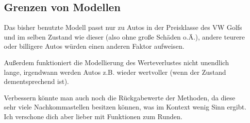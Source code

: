 \documentclass{scrartcl}   %
\begin{document}
\subsection{Grenzen von Modellen}

Das bisher benutzte Modell passt nur zu Autos in der Preisklasse des VW Golfs und im selben Zustand wie dieser (also ohne große Schäden o.Ä.), andere teurere oder billigere Autos würden einen anderen Faktor aufweisen.

Außerdem funktioniert die Modellierung des Werteverlustes nicht unendlich lange, irgendwann werden Autos z.B. wieder wertvoller (wenn der Zustand dementsprechend ist).

Verbessern könnte man auch noch die Rückgabewerte der Methoden, da diese sehr viele Nachkommastellen besitzen können, was im Kontext wenig Sinn ergibt. Ich verschone dich aber lieber mit Funktionen zum Runden.
\end{document}
